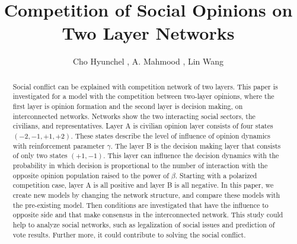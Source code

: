 \documentclass[english]{cccconf}
\begin{document}
\title{Competition of Social Opinions on Two Layer Networks}


\author{Cho Hyunchel ,
        A. Mahmood ,
        Lin Wang }

\maketitle

\begin{abstract}
Social conflict can be explained with competition network of two layers. This paper is investigated for a model with the competition between two-layer opinions, where the first layer is opinion formation and the second layer is decision making, on interconnected networks. Networks show the two interacting social sectors, the civilians, and representatives. Layer A is civilian opinion layer consists of four states $(-2, -1, +1, +2)$. These states describe the level of influence of opinion dynamics with reinforcement parameter $\gamma$. The layer B is the decision making layer that consists of only two states $(+1, -1)$.  This layer can influence the decision dynamics with the probability in which decision is proportional to the number of interaction with the opposite opinion population raised to the power of $\beta$. Starting with a polarized competition case, layer A is all positive and layer B is all negative. In this paper, we create new models by changing the network structure, and compare these models with the pre-existing model. Then conditions are investigated that have the influence to opposite side and that make consensus in the interconnected network. This study could help to analyze social networks, such as legalization of social issues and prediction of vote results. Further more, it could contribute to solving the social conflict.
\end{abstract}
\end{document}
